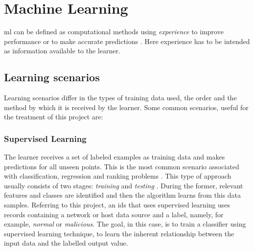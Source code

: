 
\section{Machine Learning}
\label{sec:machine-learning}


 \gls{ml} can be defined as computational methods using \textit{experience} to improve performance or to make accurate predictions \cite{Mohri2018}. Here experience has to be intended as information available to the learner.


\subsection{Learning scenarios}
\label{subsec:learning-scenarios}

Learning scenarios differ in the types of training data used, the order and the method by which it is received by the learner. Some common scenarios, useful for the treatment of this project are:


\subsubsection{Supervised Learning}
\label{subsubsec:supervised-learning}

The learner receives a set of labeled examples as training data and makes predictions for all unseen points. This is the most common scenario associated with classification, regression and ranking problems \cite[p. 6]{Mohri2018}. This type of approach usually consists of two stages: \textit{training} and \textit{testing} \cite{Khraisat2019}. During the former, relevant features and classes are identified and then the algorithm learns from this data samples. Referring to this project, an \gls{ids} that uses supervised learning uses records containing a network or host data source and a label, namely, for example, \textit{normal} or \textit{malicious}. The goal, in this case, is to train a classifier using supervised learning technique, to learn the inherent relationship between the input data and the labelled output value.

